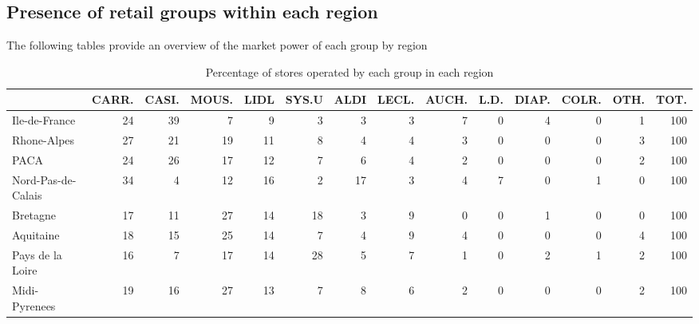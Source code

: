 \documentclass[11pt]{article}
\begin{document}
\subsection{Presence of retail groups within each region}

The following tables provide an overview of the market power of each group by region

\begin{table}[H]
\caption{Percentage of stores operated by each group in each region}
\footnotesize
\setlength{\tabcolsep}{2pt}

\begin{tabular}{lrrrrrrrrrrrrr}
\toprule
{} &      CARR. &      CASI. &      MOUS. &       LIDL &      SYS.U &       ALDI &      LECL. &      AUCH. &       L.D. &      DIAP. &      COLR. &       OTH. &       TOT. \\
\midrule
Ile-de-France        &         24 &         39 &          7 &          9 &          3 &          3 &          3 &          7 &          0 &          4 &          0 &          1 &        100 \\
Rhone-Alpes          &         27 &         21 &         19 &         11 &          8 &          4 &          4 &          3 &          0 &          0 &          0 &          3 &        100 \\
PACA                 &         24 &         26 &         17 &         12 &          7 &          6 &          4 &          2 &          0 &          0 &          0 &          2 &        100 \\
Nord-Pas-de-Calais   &         34 &          4 &         12 &         16 &          2 &         17 &          3 &          4 &          7 &          0 &          1 &          0 &        100 \\
Bretagne             &         17 &         11 &         27 &         14 &         18 &          3 &          9 &          0 &          0 &          1 &          0 &          0 &        100 \\
Aquitaine            &         18 &         15 &         25 &         14 &          7 &          4 &          9 &          4 &          0 &          0 &          0 &          4 &        100 \\
Pays de la Loire     &         16 &          7 &         17 &         14 &         28 &          5 &          7 &          1 &          0 &          2 &          1 &          2 &        100 \\
Midi-Pyrenees        &         19 &         16 &         27 &         13 &          7 &          8 &          6 &          2 &          0 &          0 &          0 &          2 &        100 \\

\end{tabular}
\end{table}
\end{document}
